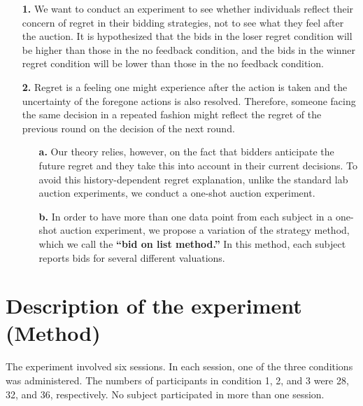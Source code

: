 \documentclass[10pt,a4paper,oneside]{report}
\begin{document}
\begin{enumerate}

\item[\textbf{1.}] We want to conduct an experiment to see whether individuals reflect their concern of regret in their bidding strategies, not to see what they feel after the auction. It is hypothesized that the bids in the loser regret condition will be higher than those in the no feedback condition, and the bids in the winner regret condition will be lower than those in the no feedback condition.
\item[\textbf{2.}] Regret is a feeling one might experience after the action is taken and the uncertainty of the foregone actions is also resolved. Therefore, someone facing the same decision in a repeated fashion might reflect the regret of the previous round on the decision of the next round.\cite{bell1982regret}
\begin{enumerate}
\item[\textbf{a.}] Our theory relies, however, on the fact that bidders anticipate the future regret and they take this into account in their current decisions. To avoid this history-dependent regret explanation, unlike the standard lab auction experiments, we conduct a one-shot auction experiment.

\item[\textbf{b.}]In order to have more than one data point from each subject in a one-shot auction experiment, we propose a variation of the strategy method, which we call the \textbf{“bid on list method.”} In this method, each subject reports bids for several different valuations.	
\end{enumerate}
\end{enumerate}

\section{Description of the experiment (Method)}	
The experiment involved six sessions. In each session, one of the three conditions was administered. The numbers of participants in condition 1, 2, and 3 were 28, 32, and 36, respectively. No subject participated in more than one session.\citep{filizy2005auctions}
\end{document}
